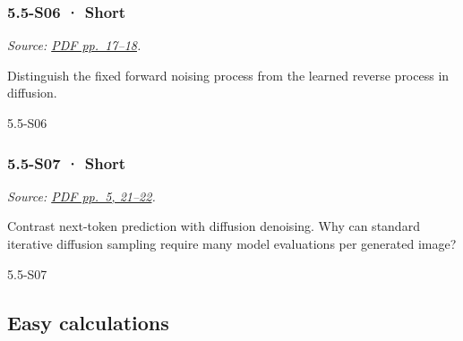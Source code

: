\noindent\begin{minipage}{\linewidth}

\subsubsection{5.5-S06 · Short}\label{s06-short-16}

\emph{Source:
\href{../Lecture\%20Slides/5.5.\%20Generative\%20Models.pdf\#page=17}{PDF
pp.~17--18}.}

Distinguish the fixed forward noising process from the learned reverse
process in diffusion.

\begin{solution}[20mm]{5.5-S06}

\end{solution}
\end{minipage}\par\medskip

\noindent\begin{minipage}{\linewidth}

\subsubsection{5.5-S07 · Short}\label{s07-short-16}

\emph{Source:
\href{../Lecture\%20Slides/5.5.\%20Generative\%20Models.pdf\#page=5}{PDF
pp.~5, 21--22}.}

Contrast next-token prediction with diffusion denoising. Why can
standard iterative diffusion sampling require many model evaluations per
generated image?

\begin{solution}[20mm]{5.5-S07}

\end{solution}
\end{minipage}\par\medskip

\subsection{Easy calculations}\label{easy-calculations-17}

